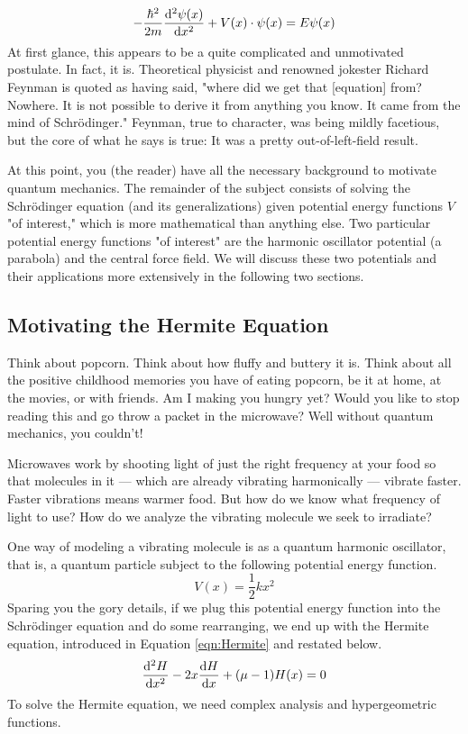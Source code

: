 \documentclass[titlepage]{article}
\numberwithin{equation}{section}
\begin{document}
\begin{equation*}
    -\frac{\hbar^2}{2m}\dv[2]{\psi(x)}{x}+V(x)\cdot\psi(x) = E\psi(x)
\end{equation*}
At first glance, this appears to be a quite complicated and unmotivated postulate. In fact, it is. Theoretical physicist and renowned jokester Richard Feynman is quoted as having said, "where did we get that [equation] from? Nowhere. It is not possible to derive it from anything you know. It came from the mind of Schr\"{o}dinger." Feynman, true to character, was being mildly facetious, but the core of what he says is true: It was a pretty out-of-left-field result.\par
At this point, you (the reader) have all the necessary background to motivate quantum mechanics. The remainder of the subject consists of solving the Schr\"{o}dinger equation (and its generalizations) given potential energy functions $V$ "of interest," which is more mathematical than anything else. Two particular potential energy functions "of interest" are the harmonic oscillator potential (a parabola) and the central force field. We will discuss these two potentials and their applications more extensively in the following two sections.


\subsection{Motivating the Hermite Equation}
Think about popcorn. Think about how fluffy and buttery it is. Think about all the positive childhood memories you have of eating popcorn, be it at home, at the movies, or with friends. Am I making you hungry yet? Would you like to stop reading this and go throw a packet in the microwave? Well without quantum mechanics, you couldn't!\par
Microwaves work by shooting light of just the right frequency at your food so that molecules in it --- which are already vibrating harmonically --- vibrate faster. Faster vibrations means warmer food. But how do we know what frequency of light to use? How do we analyze the vibrating molecule we seek to irradiate?\par
One way of modeling a vibrating molecule is as a quantum harmonic oscillator, that is, a quantum particle subject to the following potential energy function.
\begin{equation*}
    V(x) = \frac{1}{2}kx^2
\end{equation*}
Sparing you the gory details, if we plug this potential energy function into the Schr\"{o}dinger equation and do some rearranging, we end up with the Hermite equation, introduced in Equation \ref{eqn:Hermite} and restated below.
\begin{equation*}
    \dv[2]{H}{x}-2x\dv{H}{x}+(\mu-1)H(x) = 0
\end{equation*}
To solve the Hermite equation, we need complex analysis and hypergeometric functions.
\end{document}
